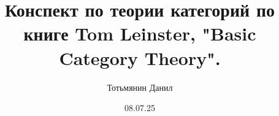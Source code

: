 \documentclass[12pt, a4paper, oneside]{memoir}
\title{Конспект по теории категорий по книге Tom Leinster, "Basic Category Theory".}
\author{Тотьмянин Данил}
\date{08.07.25}
\begin{document}
\begin{titlingpage}
    \maketitle
\end{titlingpage}


\tableofcontents
\end{document}
